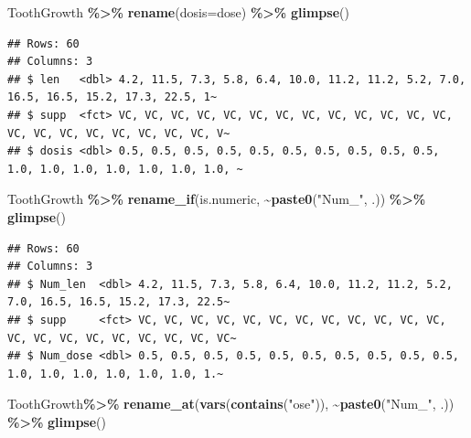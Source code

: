 \documentclass[
]{book}
\newenvironment{Shaded}{\begin{snugshade}}{\end{snugshade}}
\newcommand{\AttributeTok}[1]{\textcolor[rgb]{0.13,0.29,0.53}{#1}}
\newcommand{\FunctionTok}[1]{\textcolor[rgb]{0.13,0.29,0.53}{\textbf{#1}}}
\newcommand{\NormalTok}[1]{#1}
\newcommand{\SpecialCharTok}[1]{\textcolor[rgb]{0.81,0.36,0.00}{\textbf{#1}}}
\newcommand{\StringTok}[1]{\textcolor[rgb]{0.31,0.60,0.02}{#1}}
\begin{document}
\begin{Shaded}
\begin{Highlighting}[]
\NormalTok{ToothGrowth }\SpecialCharTok{\%\textgreater{}\%} \FunctionTok{rename}\NormalTok{(}\AttributeTok{dosis=}\NormalTok{dose) }\SpecialCharTok{\%\textgreater{}\%} \FunctionTok{glimpse}\NormalTok{()}
\end{Highlighting}
\end{Shaded}

\begin{verbatim}
## Rows: 60
## Columns: 3
## $ len   <dbl> 4.2, 11.5, 7.3, 5.8, 6.4, 10.0, 11.2, 11.2, 5.2, 7.0, 16.5, 16.5, 15.2, 17.3, 22.5, 1~
## $ supp  <fct> VC, VC, VC, VC, VC, VC, VC, VC, VC, VC, VC, VC, VC, VC, VC, VC, VC, VC, VC, VC, VC, V~
## $ dosis <dbl> 0.5, 0.5, 0.5, 0.5, 0.5, 0.5, 0.5, 0.5, 0.5, 0.5, 1.0, 1.0, 1.0, 1.0, 1.0, 1.0, 1.0, ~
\end{verbatim}

\begin{Shaded}
\begin{Highlighting}[]
\NormalTok{ToothGrowth }\SpecialCharTok{\%\textgreater{}\%} \FunctionTok{rename\_if}\NormalTok{(is.numeric, }\SpecialCharTok{\textasciitilde{}}\FunctionTok{paste0}\NormalTok{(}\StringTok{"Num\_"}\NormalTok{, .)) }\SpecialCharTok{\%\textgreater{}\%} \FunctionTok{glimpse}\NormalTok{()}
\end{Highlighting}
\end{Shaded}

\begin{verbatim}
## Rows: 60
## Columns: 3
## $ Num_len  <dbl> 4.2, 11.5, 7.3, 5.8, 6.4, 10.0, 11.2, 11.2, 5.2, 7.0, 16.5, 16.5, 15.2, 17.3, 22.5~
## $ supp     <fct> VC, VC, VC, VC, VC, VC, VC, VC, VC, VC, VC, VC, VC, VC, VC, VC, VC, VC, VC, VC, VC~
## $ Num_dose <dbl> 0.5, 0.5, 0.5, 0.5, 0.5, 0.5, 0.5, 0.5, 0.5, 0.5, 1.0, 1.0, 1.0, 1.0, 1.0, 1.0, 1.~
\end{verbatim}

\begin{Shaded}
\begin{Highlighting}[]
\NormalTok{ToothGrowth}\SpecialCharTok{\%\textgreater{}\%} \FunctionTok{rename\_at}\NormalTok{(}\FunctionTok{vars}\NormalTok{(}\FunctionTok{contains}\NormalTok{(}\StringTok{"ose"}\NormalTok{)), }\SpecialCharTok{\textasciitilde{}}\FunctionTok{paste0}\NormalTok{(}\StringTok{"Num\_"}\NormalTok{, .)) }\SpecialCharTok{\%\textgreater{}\%} \FunctionTok{glimpse}\NormalTok{()}
\end{Highlighting}
\end{Shaded}
\end{document}
